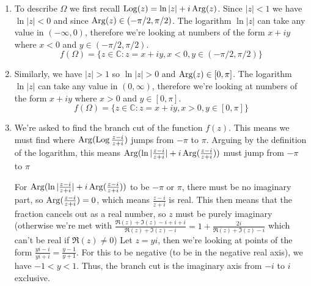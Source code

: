 \begin{enumerate}
	\item To describe $\Omega$ we first recall $\operatorname{Log}(z) =
		      \ln|z|
		      + i\operatorname{Arg}(z)$. Since $|z| < 1$ we have
	      $\ln|z| < 0$
	      and since $\operatorname{Arg}(z) \in
		      (-\pi/2, \pi/2)$. The logarithm $\ln|z|$
	      can take
	      any value in $(-\infty, 0)$, therefore we're
	      looking at
	      numbers of the form $x + iy$ where $x < 0$ and $y
		      \in
		      (-\pi/2, \pi/2)$.
	      \begin{equation*}
		      f(\Omega) = \{z \in \mathbb{C} : z = x +
		      iy, x <
		      0, y \in (-\pi/2, \pi/2)\}
	      \end{equation*}
	\item Similarly, we have $|z| > 1$ so $\ln|z| > 0$ and
	      $\operatorname{Arg}(z) \in [0, \pi]$. The logarithm $\ln|z|$ can
	      take any value in $(0, \infty)$, therefore we're
	      looking at numbers of the form $x + iy$ where $x >
		      0$
	      and
	      $y \in [0, \pi]$.
	      \begin{equation*}
		      f(\Omega) = \{z \in \mathbb{C} : z = x +
		      iy, x >
		      0, y \in [0, \pi]\}
	      \end{equation*}

	\item We're asked to find the branch cut of the function
	      $f(z)$. This means we must find where $\operatorname{Arg}(\operatorname{Log}\frac{z-i}{z+i})$
	      jumps from $-\pi$ to $\pi$. Arguing by the definition of the
	      logarithm, this means $\operatorname{Arg}(\ln|\frac{z-i}{z+i}| +
		      i\operatorname{Arg}(\frac{z-i}{z+i}))$ must jump from
	      $-\pi$ to $\pi$

	      For $\operatorname{Arg}(\ln|\frac{z-i}{z+i}| + i\operatorname{Arg}(\frac{z-i}{z+i}))$ to be
	      $-\pi$ or $\pi$, there
	      must be no imaginary part, so $\operatorname{Arg}(\frac{z-i}{z+i}) = 0$, which
	      means $\frac{z-i}{z+i}$ is
	      real. This then means that the fraction cancels out as a real
	      number, so $z$ must be purely imaginary (otherwise we're met with
	      $\frac{\Re(z)
			      + \Im(z) - i + i + i}{\Re(z) + \Im(z) - i} = 1 +
		      \frac{2i}{\Re(z) + \Im(z) -
			      i}$ which can't be real if $\Re(z) \neq 0$)
	      Let $z = yi$, then we're looking at points of the form
	      $\frac{yi-i}{yi+i} = \frac{y -1}{y+1}$. For this to be negative
	      (to be in the negative real axis), we have $-1 < y < 1$. Thus, the branch cut
	      is the imaginary axis from $-i$ to $i$ exclusive.

\end{enumerate}